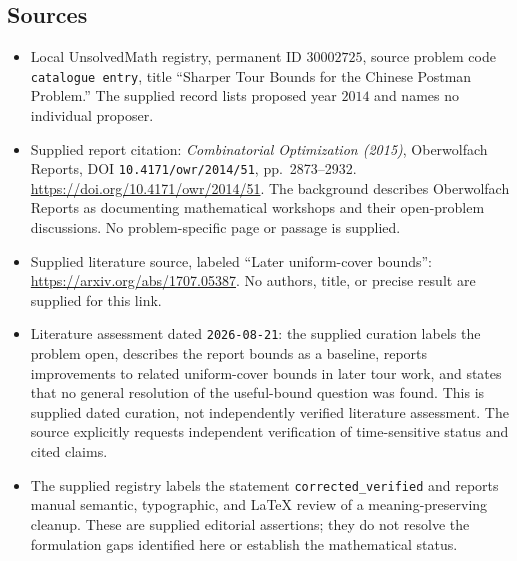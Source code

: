 \documentclass[11pt]{article}
\begin{document}
\subsection{Sources}
\begin{itemize}
\item Local UnsolvedMath registry, permanent ID $30002725$, source problem code \texttt{catalogue entry}, title ``Sharper Tour Bounds for the Chinese Postman Problem.'' The supplied record lists proposed year $2014$ and names no individual proposer.
\item Supplied report citation: \emph{Combinatorial Optimization (2015)}, Oberwolfach Reports, DOI \texttt{10.4171/owr/2014/51}, pp.~2873--2932. \url{https://doi.org/10.4171/owr/2014/51}. The background describes Oberwolfach Reports as documenting mathematical workshops and their open-problem discussions. No problem-specific page or passage is supplied.
\item Supplied literature source, labeled ``Later uniform-cover bounds'': \url{https://arxiv.org/abs/1707.05387}. No authors, title, or precise result are supplied for this link.
\item Literature assessment dated \texttt{2026-08-21}: the supplied curation labels the problem open, describes the report bounds as a baseline, reports improvements to related uniform-cover bounds in later tour work, and states that no general resolution of the useful-bound question was found. This is supplied dated curation, not independently verified literature assessment. The source explicitly requests independent verification of time-sensitive status and cited claims.
\item The supplied registry labels the statement \texttt{corrected\_verified} and reports manual semantic, typographic, and LaTeX review of a meaning-preserving cleanup. These are supplied editorial assertions; they do not resolve the formulation gaps identified here or establish the mathematical status.
\end{itemize}
\end{document}

